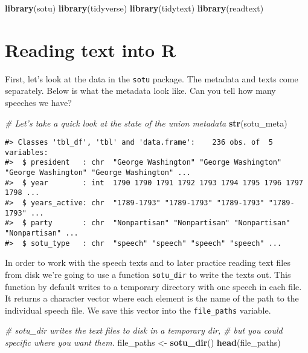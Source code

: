 \documentclass[]{book}
\newenvironment{Shaded}{\begin{snugshade}}{\end{snugshade}}
\newcommand{\CommentTok}[1]{\textcolor[rgb]{0.56,0.35,0.01}{\textit{#1}}}
\newcommand{\KeywordTok}[1]{\textcolor[rgb]{0.13,0.29,0.53}{\textbf{#1}}}
\newcommand{\NormalTok}[1]{#1}
\newcommand{\StringTok}[1]{\textcolor[rgb]{0.31,0.60,0.02}{#1}}
\begin{document}
\begin{Shaded}
\begin{Highlighting}[]
\KeywordTok{library}\NormalTok{(sotu)}
\KeywordTok{library}\NormalTok{(tidyverse)}
\KeywordTok{library}\NormalTok{(tidytext)}
\KeywordTok{library}\NormalTok{(readtext)}
\end{Highlighting}
\end{Shaded}

\hypertarget{reading-text-into-r}{%
\section{Reading text into R}\label{reading-text-into-r}}

First, let's look at the data in the \texttt{sotu} package. The metadata and texts come separately. Below is what the metadata look like. Can you tell how many speeches we have?

\begin{Shaded}
\begin{Highlighting}[]
\CommentTok{# Let's take a quick look at the state of the union metadata}
\KeywordTok{str}\NormalTok{(sotu_meta)}
\end{Highlighting}
\end{Shaded}

\begin{verbatim}
#> Classes 'tbl_df', 'tbl' and 'data.frame':    236 obs. of  5 variables:
#>  $ president   : chr  "George Washington" "George Washington" "George Washington" "George Washington" ...
#>  $ year        : int  1790 1790 1791 1792 1793 1794 1795 1796 1797 1798 ...
#>  $ years_active: chr  "1789-1793" "1789-1793" "1789-1793" "1789-1793" ...
#>  $ party       : chr  "Nonpartisan" "Nonpartisan" "Nonpartisan" "Nonpartisan" ...
#>  $ sotu_type   : chr  "speech" "speech" "speech" "speech" ...
\end{verbatim}

In order to work with the speech texts and to later practice reading text files from disk we're going to use a function \texttt{sotu\_dir} to write the texts out. This function by default writes to a temporary directory with one speech in each file. It returns a character vector where each element is the name of the path to the individual speech file. We save this vector into the \texttt{file\_paths} variable.

\begin{Shaded}
\begin{Highlighting}[]
\CommentTok{# sotu_dir writes the text files to disk in a temporary dir, }
\CommentTok{# but you could specific where you want them.}
\NormalTok{file_paths <-}\StringTok{ }\KeywordTok{sotu_dir}\NormalTok{()}
\KeywordTok{head}\NormalTok{(file_paths)}
\end{Highlighting}
\end{Shaded}
\end{document}
